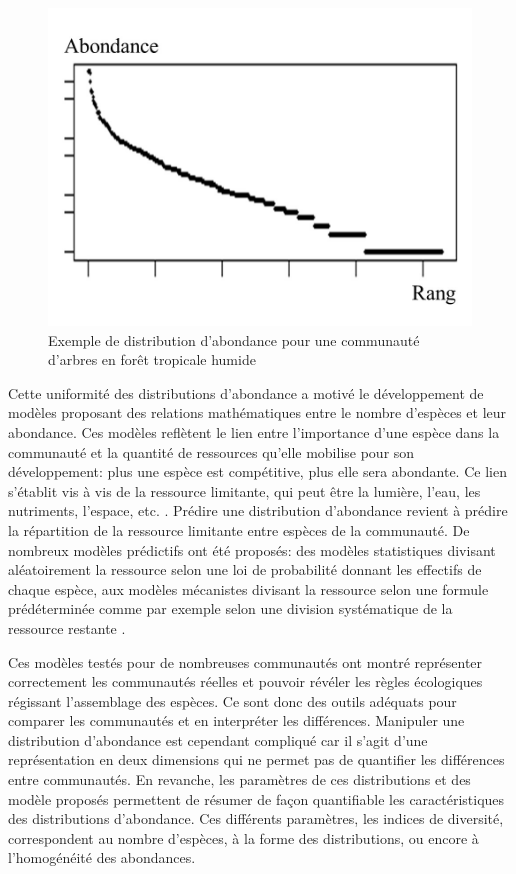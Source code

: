 \documentclass[
  11pt,
  french,
  A4paper,
  extrafontsizes,onecolumn,openright
  ]{memoir}
\begin{document}
\begin{figure}

{\centering \includegraphics[width=0.6\linewidth]{ExternalFig/SpeciesAbdDist} 

}

\caption{Exemple de distribution d'abondance pour une communauté d'arbres en forêt tropicale humide}\label{fig:AbdDist}
\end{figure}

Cette uniformité des distributions d'abondance a motivé le développement
de modèles proposant des relations mathématiques entre le nombre
d'espèces et leur abondance. Ces modèles reflètent le lien entre
l'importance d'une espèce dans la communauté et la quantité de
ressources qu'elle mobilise pour son développement: plus une espèce est
compétitive, plus elle sera abondante. Ce lien s'établit vis à vis de la
ressource limitante, qui peut être la lumière, l'eau, les nutriments,
l'espace, etc. \autocites{Silvertown2004}{TerSteege2006}. Prédire une
distribution d'abondance revient à prédire la répartition de la
ressource limitante entre espèces de la communauté. De nombreux modèles
prédictifs ont été proposés: des modèles statistiques divisant
aléatoirement la ressource selon une loi de probabilité donnant les
effectifs de chaque espèce, aux modèles mécanistes divisant la ressource
selon une formule prédéterminée comme par exemple selon une division
systématique de la ressource restante
\autocites{Fisher1943}{Motomura1932}{Tokeshi1993}{Magurran1988}.

Ces modèles testés pour de nombreuses communautés ont montré représenter
correctement les communautés réelles et pouvoir révéler les règles
écologiques régissant l'assemblage des espèces. Ce sont donc des outils
adéquats pour comparer les communautés et en interpréter les
différences. Manipuler une distribution d'abondance est cependant
compliqué car il s'agit d'une représentation en deux dimensions qui ne
permet pas de quantifier les différences entre communautés. En revanche,
les paramètres de ces distributions et des modèle proposés permettent de
résumer de façon quantifiable les caractéristiques des distributions
d'abondance. Ces différents paramètres, les indices de diversité,
correspondent au nombre d'espèces, à la forme des distributions, ou
encore à l'homogénéité des abondances.
\end{document}

